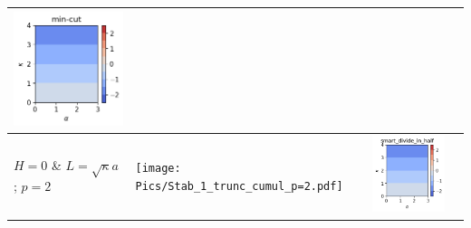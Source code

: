\begin{landscape}
\begin{longtable}{|p{3cm}|p{7.2cm}|p{7.2cm}|p{7.2cm}|}
\begin{minipage}{7cm}
        \includegraphics[width=\textwidth]{Pics/Stab_1_min_cut.pdf}
    \end{minipage}\\
    \hline
    $H=0$ \& $L = \sqrt{\kappa} a$ ; $p=2$ &
    \begin{minipage}{7cm}
        \centering
        \texttt{[image: Pics/Stab\_1\_trunc\_cumul\_p=2.pdf]}
    \end{minipage}&
    \begin{minipage}{7cm}
        \centering
        \includegraphics[width=\textwidth]{Pics/Stab_1_divide_in_half_p=2.pdf}

\end{minipage}
\end{longtable}
\end{landscape}
